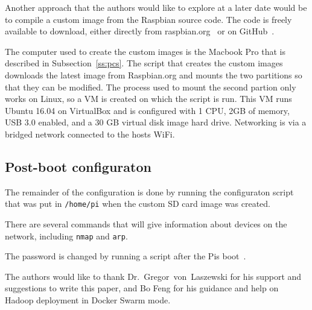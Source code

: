 Another approach that the authors would like to explore at a later
date would be to compile a custom image from the Raspbian source
code. The code is freely available to download, either directly from
raspbian.org~\cite{hid-sp18-419-raspbian-distro} or on
GitHub~\cite{hid-sp18-419-pi-gen}.

The computer used to create the custom images is the Macbook Pro that
is described in Subsection~\ref{ss:pcs}. The script that creates the
custom images downloads the latest image from Raspbian.org and mounts
the two partitions so that they can be modified. The process used to
mount the second partion only works on Linux, so a VM is created on
which the script is run. This VM runs Ubuntu 16.04 on VirtualBox and
is configured with 1 CPU, 2GB of memory, USB 3.0 enabled, and a 30 GB
virtual disk image hard drive. Networking is via a bridged network
connected to the hosts WiFi.

\subsection{Post-boot configuraton}
The remainder of the configuration is done by running the configuraton
script that was put in \verb|/home/pi| when the custom SD card image
was created.

There are several commands that will give information about devices on
the network, including \verb|nmap| and \verb|arp|.

The password is changed by running a script after the Pis
boot~\cite{hid-sp18-419-so-password}.

\begin{acks}

  The authors would like to thank Dr.~Gregor~von~Laszewski for his
  support and suggestions to write this paper, and Bo Feng for his guidance 
  and help on Hadoop deployment in Docker Swarm mode.

\end{acks}



